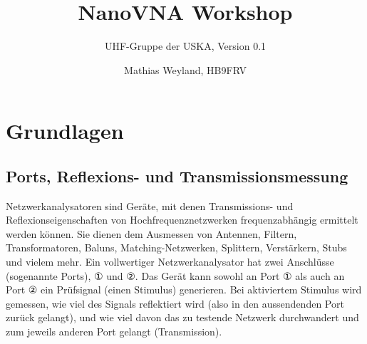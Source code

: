 \documentclass[twoside,a4paper,11pt,halfparskip,DIV=11,notitlepage]{scrartcl}
\title{NanoVNA Workshop}
\author{UHF-Gruppe der USKA, Version 0.1}
\date{Mathias Weyland, HB9FRV} %
\newcounter{uebungscounter}
\newcommand{\uebung}[1]{
    \stepcounter{uebungscounter}
    \section{Übung \arabic{uebungscounter}: #1}
    \renewcommand{\labelenumi}{\arabic{uebungscounter}.\arabic{enumi}}
}
\begin{document}
\maketitle
\thispagestyle{empty}

\setcounter{tocdepth}{1}
\tableofcontents

\vfill


\vfill

\newpage




\section{Grundlagen}

\subsection{Ports, Reflexions- und Transmissionsmessung}\label{sec:ports}
Netzwerkanalysatoren sind Geräte, mit denen Transmissions- und
Reflexionseigenschaften von Hochfrequenznetzwerken frequenzabhängig ermittelt
werden können. Sie dienen dem Ausmessen von Antennen, Filtern, Transformatoren,
Baluns, Matching-Netzwerken, Splittern, Verstärkern, Stubs und vielem mehr. Ein
vollwertiger Netzwerkanalysator hat zwei Anschlüsse (sogenannte Ports), ① und ②.
Das Gerät kann sowohl an Port ① als auch an Port ② ein Prüfsignal (einen 
Stimulus) generieren. Bei aktiviertem Stimulus wird gemessen, wie viel des
Signals reflektiert wird (also in den aussendenden Port zurück gelangt), und
wie viel davon das zu testende Netzwerk durchwandert und zum jeweils anderen
Port gelangt (Transmission).
\end{document}
